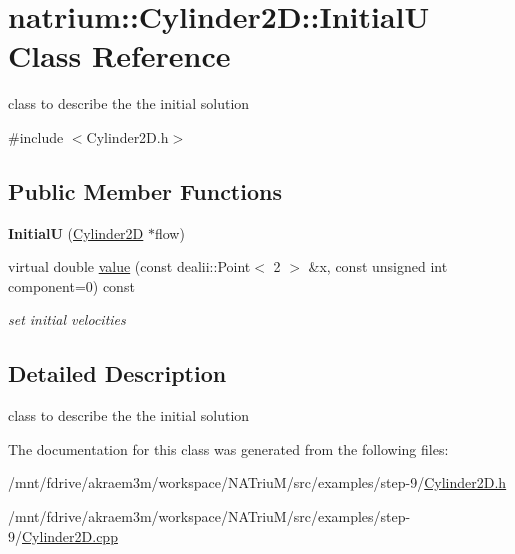 \hypertarget{classnatrium_1_1Cylinder2D_1_1InitialU}{
\section{natrium::Cylinder2D::InitialU Class Reference}
\label{classnatrium_1_1Cylinder2D_1_1InitialU}
}


class to describe the the initial solution  


{\ttfamily \#include $<$Cylinder2D.h$>$}\subsection*{Public Member Functions}
\begin{DoxyCompactItemize}
\item 
\hypertarget{classnatrium_1_1Cylinder2D_1_1InitialU_af4b2851cc815e956b434c664ccaa8915}{
{\bfseries InitialU} (\hyperlink{classnatrium_1_1Cylinder2D}{Cylinder2D} $\ast$flow)}
\label{classnatrium_1_1Cylinder2D_1_1InitialU_af4b2851cc815e956b434c664ccaa8915}

\item 
\hypertarget{classnatrium_1_1Cylinder2D_1_1InitialU_a57d333724d661f25b71d90bbf502c97d}{
virtual double \hyperlink{classnatrium_1_1Cylinder2D_1_1InitialU_a57d333724d661f25b71d90bbf502c97d}{value} (const dealii::Point$<$ 2 $>$ \&x, const unsigned int component=0) const }
\label{classnatrium_1_1Cylinder2D_1_1InitialU_a57d333724d661f25b71d90bbf502c97d}

\begin{DoxyCompactList}\small\item\em set initial velocities \item\end{DoxyCompactList}\end{DoxyCompactItemize}


\subsection{Detailed Description}
class to describe the the initial solution 

The documentation for this class was generated from the following files:\begin{DoxyCompactItemize}
\item 
/mnt/fdrive/akraem3m/workspace/NATriuM/src/examples/step-\/9/\hyperlink{Cylinder2D_8h}{Cylinder2D.h}\item 
/mnt/fdrive/akraem3m/workspace/NATriuM/src/examples/step-\/9/\hyperlink{Cylinder2D_8cpp}{Cylinder2D.cpp}\end{DoxyCompactItemize}
